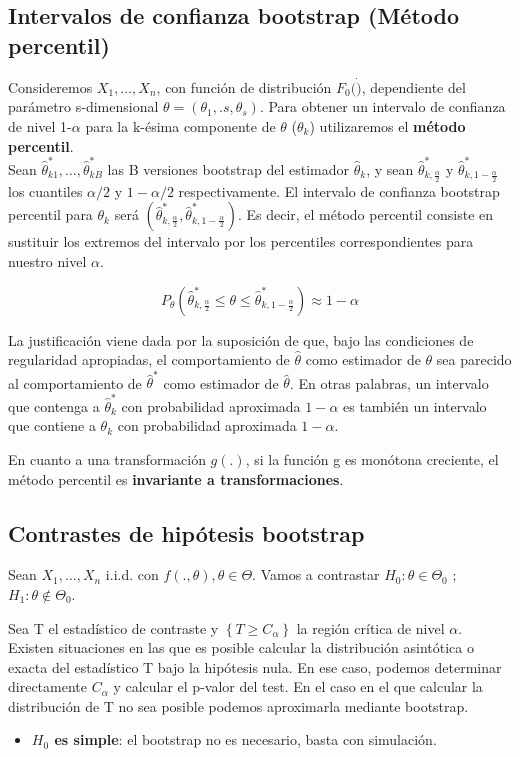 \subsection{Intervalos de confianza bootstrap (Método percentil)}
Consideremos $X_1,\dots,X_n$, con función de distribución $F_0(\dot)$, dependiente del parámetro s-dimensional $\theta=(\theta_1,.s,\theta_s)$. Para obtener un intervalo de confianza de nivel 1-$\alpha$ para la k-ésima componente de $\theta$ ($\theta_k$) utilizaremos el \textbf{método percentil}.\\

Sean $\hat\theta_{k1}^*,\dots,\hat\theta_{kB}^*$ las B versiones bootstrap del estimador $\hat\theta_k$, y sean $\hat\theta^*_{k,\frac{\alpha}{2}}$ y $\hat\theta^*_{k,1-\frac{\alpha}{2}}$ los cuantiles $\alpha/2$ y $1-\alpha/2$ respectivamente.
El intervalo de confianza bootstrap percentil para $\theta_k$ será $\left(\hat\theta^*_{k,\frac{\alpha}{2}},\hat\theta^*_{k,1-\frac{\alpha}{2}} \right)$. Es decir, el método percentil consiste en sustituir los extremos del intervalo por los percentiles correspondientes para nuestro nivel $\alpha$.

$$P_\theta\left(\hat\theta^*_{k,\frac{\alpha}{2}}\leq\theta\leq\hat\theta^*_{k,1-\frac{\alpha}{2}}\right)\approx 1-\alpha$$

La justificación viene dada por la suposición de que, bajo las condiciones de regularidad apropiadas, el comportamiento de $\hat\theta$ como estimador de $\theta$ sea parecido al comportamiento de $\hat\theta^*$ como estimador de $\hat\theta$.
En otras palabras, un intervalo que contenga a $\hat\theta^*_{k}$ con probabilidad aproximada $1-\alpha$ es también un intervalo que contiene a $\theta_k$ con probabilidad aproximada $1-\alpha$.

En cuanto a una transformación $g(.)$, si la función g es monótona creciente, el método percentil es \textbf{invariante a transformaciones}.

\subsection{Contrastes de hipótesis bootstrap}

Sean $X_1,\dots,X_n$ i.i.d. con $f(.,\theta), \theta\in\Theta$. Vamos a contrastar $H_0: \theta\in\Theta_0$ ; $H_1:\theta\notin\Theta_0$.

Sea T el estadístico de contraste y $\left\{T \geq C_\alpha\right\}$ la región crítica de nivel $\alpha$. Existen situaciones en las que es posible calcular la distribución asintótica o exacta del estadístico T bajo la hipótesis nula. 
En ese caso, podemos determinar directamente $C_\alpha$ y calcular el p-valor del test. En el caso en el que calcular la distribución de T no sea posible podemos aproximarla mediante bootstrap.

\begin{itemize}
    \item \textbf{$H_0$ es simple}: el bootstrap no es necesario, basta con simulación.
\end{itemize}

